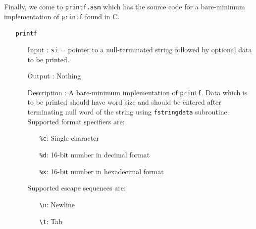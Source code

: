 Finally, we come to \texttt{printf.asm} which has the source code for a bare-minimum implementation of \texttt{printf} found in C.
\begin{enumerate}
  \item[]\texttt{printf}
  		\begin{enumerate}[align=parleft, labelsep=2cm, leftmargin=1.06in]
  		  \item[Input]: \texttt{si} = pointer to a null-terminated string followed by optional data to be printed.
  		  \item[Output]: Nothing
  		  \item[Description]: A bare-minimum implementation of \texttt{printf}. Data which is to be printed should have word size and should be entered after terminating null word of the string using \texttt{fstringdata} subroutine. Supported format specifiers are:
  		  \begin{enumerate}[align=parleft, labelsep=2cm]
  		    \item[]\verb|%c|: Single character
  		    \item[]\verb|%d|: 16-bit number in decimal format
  		    \item[]\verb|%x|: 16-bit number in hexadecimal format
  		  \end{enumerate}
Supported escape sequences are:
  		  \begin{enumerate}[align=parleft, labelsep=2cm]
  		    \item[]\verb|\n|: Newline
  		    \item[]\verb|\t|: Tab
  		  \end{enumerate}
  		\end{enumerate}
\end{enumerate}

